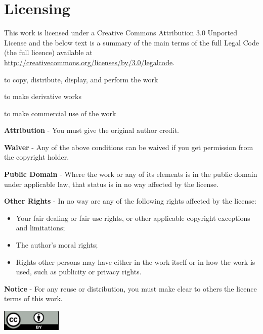 \chapter{Licensing}

This work is licensed under a Creative Commons Attribution 3.0 Unported License and
the below text is a summary of the main terms of the full Legal Code (the full licence) available at
\url{http://creativecommons.org/licenses/by/3.0/legalcode}.

\begin{description}[style=multiline,labelindent=0cm,align=left,leftmargin=1.5cm]
\item[You are free:] \hfill

to copy, distribute, display, and perform the work 

to make derivative works

to make commercial use of the work
  
\item[Under the following conditions:] \hfill

  \textbf{Attribution} - You must give the original author credit.
  
\item[With the understanding that:] \hfill

  \textbf{Waiver} - Any of the above conditions can be waived if you get permission from the
  copyright holder.
  
  \textbf{Public Domain} - Where the work or any of its elements is in the public domain
  under applicable law, that status is in no way affected by the license.
  
  \textbf{Other Rights} - In no way are any of the following rights affected by the license:
  
  \begin{itemize}
    \item Your fair dealing or fair use rights, or other applicable copyright exceptions and limitations;
  
    \item The author's moral rights;
  
    \item Rights other persons may have either in the work itself or in how the work is used, such
    as publicity or privacy rights.
  \end{itemize}
  
  \textbf{Notice} - For any reuse or distribution, you must make clear to others the
  licence terms of this work.
  
\end{description}

\vspace{\fill}

\begin{center}
\includegraphics[height=1cm]{licences/cc_by.png}
\end{center}
